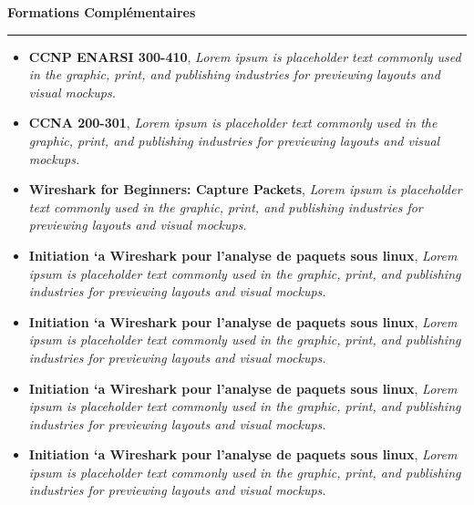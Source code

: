 \documentclass[a4paper]{letter}
\newcommand{\divider}{\rule{\linewidth}{0.9pt}}
\begin{document}
\begin{minipage}[t]{0.60\textwidth}
\begin{itemize}
\end{itemize}

\vspace{3mm}


{\large \textbf{Formations Complémentaires}}
\divider
\vspace{4mm}
\begin{itemize}
    \footnotesize \item {\textbf{CCNP ENARSI 300-410}, \textit{Lorem ipsum is placeholder text commonly used in the graphic, print, and publishing industries for previewing layouts and visual mockups.}}
    \footnotesize \item {\textbf{CCNA 200-301}, \textit{Lorem ipsum is placeholder text commonly used in the graphic, print, and publishing industries for previewing layouts and visual mockups.}}
    \footnotesize \item {\textbf{Wireshark for Beginners: Capture Packets}, \textit{Lorem ipsum is placeholder text commonly used in the graphic, print, and publishing industries for previewing layouts and visual mockups.}}
    \footnotesize \item {\textbf{Initiation `a Wireshark pour l’analyse de paquets sous linux}, \textit{Lorem ipsum is placeholder text commonly used in the graphic, print, and publishing industries for previewing layouts and visual mockups.}}
    \footnotesize \item {\textbf{Initiation `a Wireshark pour l’analyse de paquets sous linux}, \textit{Lorem ipsum is placeholder text commonly used in the graphic, print, and publishing industries for previewing layouts and visual mockups.}}
    \footnotesize \item {\textbf{Initiation `a Wireshark pour l’analyse de paquets sous linux}, \textit{Lorem ipsum is placeholder text commonly used in the graphic, print, and publishing industries for previewing layouts and visual mockups.}}
    \footnotesize \item {\textbf{Initiation `a Wireshark pour l’analyse de paquets sous linux}, \textit{Lorem ipsum is placeholder text commonly used in the graphic, print, and publishing industries for previewing layouts and visual mockups.}}


\end{itemize}

\vspace{3mm}


\end{minipage}
\end{document}
